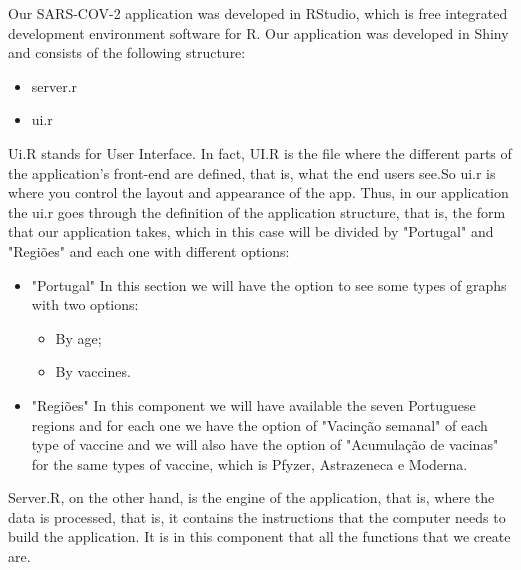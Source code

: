 Our SARS-COV-2 application was developed in RStudio, which is free integrated development environment software for R. Our application was developed in Shiny and consists of the following structure:

\begin{itemize}
    \item server.r
    \item ui.r
    
\end{itemize}
 
 Ui.R stands for User Interface. In fact, UI.R is the file where the different parts of the application's front-end are defined, that is, what the end users see.So ui.r is where you control the layout and appearance of the app.
 Thus, in our application the ui.r goes through the definition of the application structure, that is, the form that our application takes, which in this case will be divided by "Portugal" and "Regiões" and each one with different options: 
 \begin{itemize}
    \item "Portugal" 
    In this section we will have the option to see some types of graphs with two options: 
     \begin{itemize}
        \item By age; 
        \item By vaccines.

        
        \end{itemize}
    \item "Regiões"
     In this component we will have available the seven Portuguese regions and for each one we have the option of "Vacinção semanal" of each type of vaccine and we will also have the option of "Acumulação de vacinas" for the same types of vaccine, which is Pfyzer, Astrazeneca e Moderna.
     

    
\end{itemize}

Server.R, on the other hand, is the engine of the application, that is, where the data is processed, that is, it contains the instructions that the computer needs to build the application. It is in this component that all the functions that we create are. 